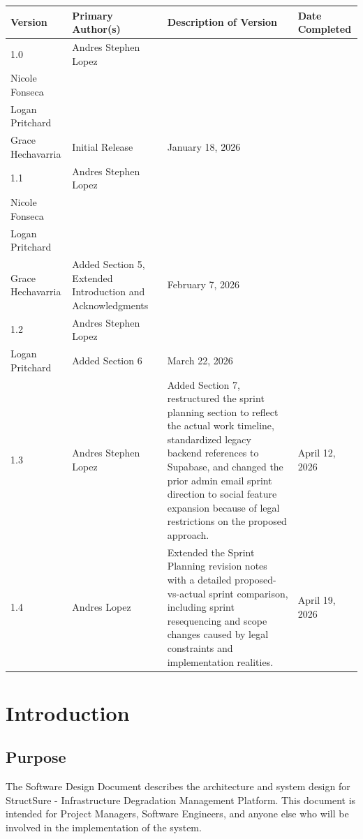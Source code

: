 \documentclass[12pt]{article}
\begin{document}
\begin{table}[H]
\centering
\begin{tabular}{|p{2cm}|p{4.5cm}|p{4cm}|l|}
\hline
\textbf{Version} & \textbf{Primary Author(s)} & \textbf{Description of Version} & \textbf{Date Completed} \\
\hline
1.0 & \raggedright Andres Stephen Lopez\\ Nicole Fonseca\\ Logan Pritchard\\ Grace Hechavarria & Initial Release & January 18, 2026 \\
\hline
1.1 & \raggedright Andres Stephen Lopez\\ Nicole Fonseca\\ Logan Pritchard\\ Grace Hechavarria & Added Section 5, Extended Introduction and Acknowledgments & February 7, 2026 \\
\hline
1.2 & \raggedright Andres Stephen Lopez\\ Logan Pritchard& Added Section 6 & March 22, 2026 \\
\hline
1.3 & \raggedright Andres Stephen Lopez & Added Section 7, restructured the sprint planning section to reflect the actual work timeline, standardized legacy backend references to Supabase, and changed the prior admin email sprint direction to social feature expansion because of legal restrictions on the proposed approach. & April 12, 2026 \\
\hline
1.4 & \raggedright Andres Lopez & Extended the Sprint Planning revision notes with a detailed proposed-vs-actual sprint comparison, including sprint resequencing and scope changes caused by legal constraints and implementation realities. & April 19, 2026 \\
\hline
\end{tabular}
\end{table}

\newpage

\tableofcontents

\newpage

\section{Introduction}

\subsection{Purpose}

The Software Design Document describes the architecture and system design for StructSure - Infrastructure Degradation Management Platform. This document is intended for Project Managers, Software Engineers, and anyone else who will be involved in the implementation of the system.
\end{document}
